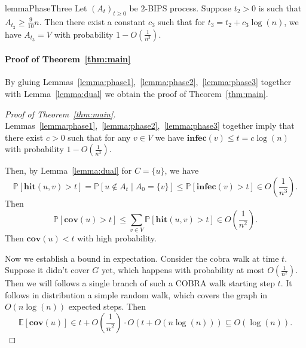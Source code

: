 \documentclass[11pt]{article}
\newcommand{\cov}{\mathbf{cov}}
\newcommand{\hit}{\mathbf{hit}}
\newcommand{\infec}{\mathbf{infec}}
\newcommand{\E}{\mathbb E}
\renewcommand{\Pr}{\mathbb P}
\theoremstyle{remark}
\begin{document}
\begin{restatable}{lemma}{PhaseThree}
    \label{lemma:phase3}
    Let $(A_t)_{t\ge 0}$ be $2$-BIPS process. Suppose $t_2 > 0$ is such that $A_{t_2} \ge \frac{9}{10}n$. Then there exist a constant $c_3$ such that for $t_3 = t_2 + c_3\log(n)$, we have $A_{t_3} = V$ with probability $1 - O\left(\frac{1}{n^3}\right)$.
\end{restatable}


\paragraph{Proof of Theorem~\ref{thm:main}} By gluing Lemmas~\ref{lemma:phase1},~\ref{lemma:phase2},~\ref{lemma:phase3} together with Lemma~\ref{lemma:dual} we obtain the proof of Theorem~\ref{thm:main}.


\begin{proof}[Proof of Theorem~\ref{thm:main}]
    Lemmas~\ref{lemma:phase1},~\ref{lemma:phase2},~\ref{lemma:phase3} together imply that there exist $c > 0$ such that for any $v\in V$ we have $\infec(v) \le t =  c\log(n)$ with probability $1 - O\left(\frac{1}{n^3}\right)$. 

    Then, by Lemma~\ref{lemma:dual} for $C = \{u\}$, we have 
    \[
    \Pr\left[\hit(u,v) > t \right] = \Pr\left[u \not \in A_t \mid A_0 = \{v\} \right] \le \Pr\left[\infec(v) > t\right] \in O\left(\frac{1}{n^3}\right).
    \]
    Then
    \[
    \Pr[\cov(u) > t] \le \sum_{v\in V} \Pr\left[\hit(u,v) > t \right] \in O\left(\frac{1}{n^2}\right).
    \]
    Then $\cov(u) < t$ with high probability. 

    Now we establish a bound in expectation. Consider the cobra walk at time $t$. Suppose it didn't cover $G$ yet, which happens with probability at most $O\left(\frac{1}{n^2}\right)$. Then we will follows a single branch of such a COBRA walk starting step $t$. It follows in distribution a simple random walk, which covers the graph in $O(n\log(n))$ expected steps. Then
    \[
    \E\left[\cov(u)\right] \in t + O\left(\frac{1}{n^2}\right) \cdot O(t + O(n\log(n))) \subseteq O(\log(n)).
    \]
\end{proof}

\printbibliography


\end{document}
